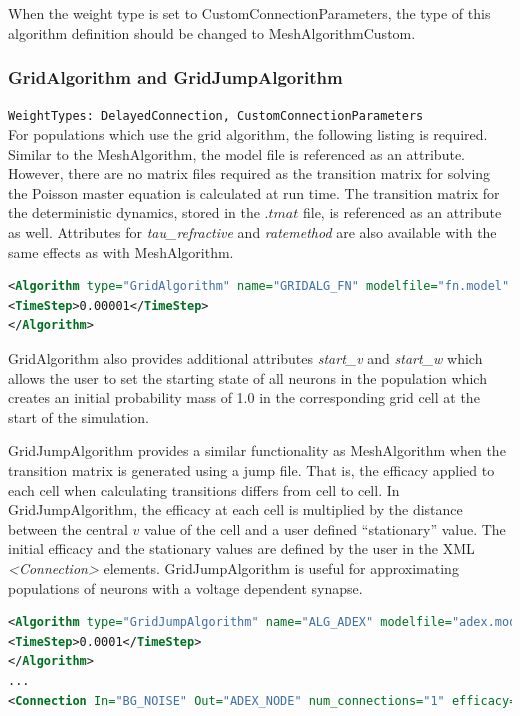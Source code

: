 \documentclass[utf8]{frontiersSCNS} %
\begin{document}
When the weight type is set to CustomConnectionParameters, the type of this algorithm definition should be changed to MeshAlgorithmCustom.\\

\subsubsection{GridAlgorithm and GridJumpAlgorithm}
\texttt{WeightTypes: DelayedConnection, CustomConnectionParameters}\\

For populations which use the grid algorithm, the following listing is required. Similar to the MeshAlgorithm, the model file is referenced as an attribute. However, there are no matrix files required as the transition matrix for solving the Poisson master equation is calculated at run time. The transition matrix for the deterministic dynamics, stored in the $.tmat$ file, is referenced as an attribute as well. Attributes for \textit{tau\_refractive} and \textit{ratemethod} are also available with the same effects as with MeshAlgorithm. 

\begin{lstlisting}[language=xml]
<Algorithm type="GridAlgorithm" name="GRIDALG_FN" modelfile="fn.model" tau_refractive="0.0" transformfile="fn_0_0_0_0_.tmat" start_v="-1.0" start_w="-0.3" ratemethod="AvgV">
<TimeStep>0.00001</TimeStep>
</Algorithm>
\end{lstlisting}

GridAlgorithm also provides additional attributes \textit{start\_v} and \textit{start\_w} which allows the user to set the starting state of all neurons in the population which creates an initial probability mass of 1.0 in the corresponding grid cell at the start of the simulation.

GridJumpAlgorithm provides a similar functionality as MeshAlgorithm when the transition matrix is generated using a jump file. That is, the efficacy applied to each cell when calculating transitions differs from cell to cell. In GridJumpAlgorithm, the efficacy at each cell is multiplied by the distance between the central $v$ value of the cell and a user defined ``stationary'' value. The initial efficacy and the stationary values are defined by the user in the XML \textit{\textless Connection\textgreater} elements. GridJumpAlgorithm is useful for approximating populations of neurons with a voltage dependent synapse.

\begin{lstlisting}[language=xml]
<Algorithm type="GridJumpAlgorithm" name="ALG_ADEX" modelfile="adex.model" tau_refractive="0.0" transformfile="adex_0_0_0_0_.tmat" start_v="-65.0" start_w="0.0">
<TimeStep>0.0001</TimeStep>
</Algorithm>
...
<Connection In="BG_NOISE" Out="ADEX_NODE" num_connections="1" efficacy="-0.05" delay="0.0" stationary="-65.0"/>
\end{lstlisting}
\end{document}

